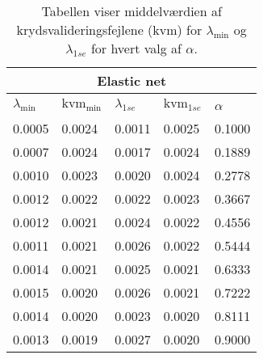 \begin{table}
\center
\begin{tabular}{lllll}
\toprule
\multicolumn{5}{c}{Elastic net} \\ \midrule
 $\lambda_{\min}$& $\text{kvm}_{\min}$ & $\lambda_{1se}$ & $\text{kvm}_{1se}$ & $\alpha$\  \\
0.0005 & 0.0024 & 0.0011 & 0.0025 & 0.1000 \\
0.0007 & 0.0024 & 0.0017 & 0.0024& 0.1889 \\
0.0010 & 0.0023 & 0.0020 & 0.0024& 0.2778 \\
0.0012 &  0.0022& 0.0022& 0.0023& 0.3667 \\
0.0012& 0.0021& 0.0024 & 0.0022&  0.4556 \\
0.0011 &  0.0021 & 0.0026 & 0.0022 &  0.5444 \\
0.0014 &  0.0021 & 0.0025 &  0.0021& 0.6333 \\
0.0015 & 0.0020 &  0.0026 & 0.0021 & 0.7222 \\
0.0014 &  0.0020 &  0.0023 &  0.0020& 0.8111 \\
0.0013& 0.0019& 0.0027& 0.0020 &  0.9000 \\ \bottomrule
\end{tabular}
\caption{Tabellen viser middelværdien af krydsvalideringsfejlene (kvm) for $\lambda_{\min}$ og $\lambda_{1se}$ for hvert valg af $\alpha$. } \label{tab:cv_el}
\end{table}